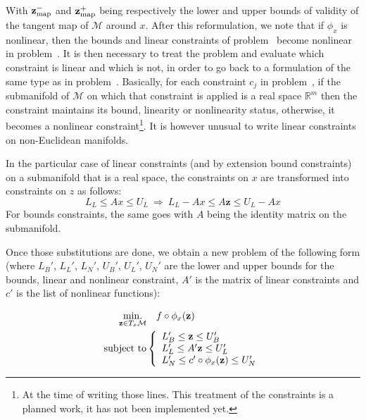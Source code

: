 With ${\bf z}_{\text{map}}^-$ and ${\bf z}_{\text{map}}^+$ being respectively the lower and upper bounds of validity of the tangent map of $\mathcal{M}$ around $x$.
After this reformulation, we note that if $\phi_x$ is nonlinear, then the bounds and linear constraints of problem~ become nonlinear in problem~.
It is then necessary to treat the problem and evaluate which constraint is linear and which is not, in order to go back to a formulation of the same type as in problem~.
Basically, for each constraint $c_j$ in problem~, if the submanifold of $\mathcal{M}$ on which that constraint is applied is a real space $\mathbb{R}^m$ then the constraint maintains its bound, linearity or nonlinearity status, otherwise, it becomes a nonlinear constraint\footnote{At the time of writing those lines. This treatment of the constraints is a planned work, it has not been implemented yet.}.
It is however unusual to write linear constraints on non-Euclidean manifolds.

In the particular case of linear constraints (and by extension bound constraints) on a submanifold that is a real space, the constraints on $x$ are transformed into constraints on $z$ as follows:
\begin{equation}
  L_L \leq Ax \leq U_L \ \Rightarrow \ L_L - Ax \leq A\mathbf{z} \leq U_L-Ax
\end{equation}
For bounds constraints, the same goes with $A$ being the identity matrix on the submanifold.

Once those substitutions are done, we obtain a new problem of the following form (where $L_B'$, $L_L'$, $L_N'$, $U_B'$, $U_L'$, $U_N'$ are the lower and upper bounds for the bounds, linear and nonlinear constraint, $A'$ is the matrix of linear constraints and $c'$ is the list of nonlinear functions):

\begin{align}
\label{eq:optim_txm_final}
  \operatorname*{min.}_{\mathbf{z} \in T_x\mathcal{M}} & \quad f \circ \phi_x(\mathbf{z})\\ \nonumber
  \text{subject to}&\left\{
  \begin{array}{lr}
    L_B' \leq \mathbf{z} \leq U_B' \\
    L_L' \leq A' \mathbf{z} \leq U_L' \\
    L_N' \leq c' \circ \phi_x(\mathbf{z}) \leq U_N'\\
  \end{array}\right.
\end{align}


